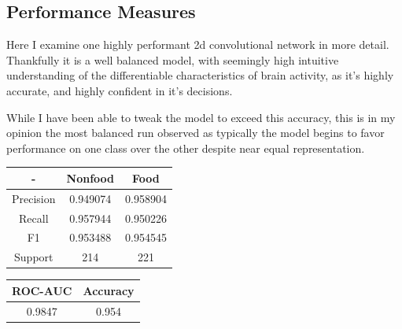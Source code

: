 \subsection{Performance Measures}\label{subsec:performance}

Here I examine one highly performant 2d convolutional network in more detail.
Thankfully it is a well balanced model, with seemingly high intuitive understanding of the differentiable characteristics
of brain activity, as it's highly accurate, and highly confident in it's decisions.

While I have been able to tweak the model to exceed this accuracy, this is in my opinion the most balanced
run observed as typically the model begins to favor performance on one class over the other despite near
equal representation.

\begin{center}
 \begin{tabular}{||c c c||}
 \hline
 - & Nonfood & Food \\ [0.5ex]
 \hline\hline
Precision & 0.949074 & 0.958904 \\
 \hline
Recall & 0.957944 & 0.950226 \\
 \hline
F1 & 0.953488 & 0.954545 \\
 \hline
Support & 214 & 221 \\ [1ex]
 \hline
\end{tabular}

\end{center}
\begin{center}
 \begin{tabular}{||c c||}
 \hline
 ROC-AUC & Accuracy \\ [0.5ex]
 \hline\hline
  0.9847 & 0.954 \\ [1ex]
 \hline
\end{tabular}
\end{center}

